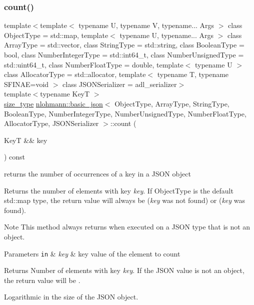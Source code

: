 \subsubsection{\texorpdfstring{count()}{count()}}
{\footnotesize\ttfamily template$<$template$<$ typename U, typename V, typename... Args $>$ class Object\+Type = std\+::map, template$<$ typename U, typename... Args $>$ class Array\+Type = std\+::vector, class String\+Type  = std\+::string, class Boolean\+Type  = bool, class Number\+Integer\+Type  = std\+::int64\+\_\+t, class Number\+Unsigned\+Type  = std\+::uint64\+\_\+t, class Number\+Float\+Type  = double, template$<$ typename U $>$ class Allocator\+Type = std\+::allocator, template$<$ typename T, typename S\+F\+I\+N\+A\+E=void $>$ class J\+S\+O\+N\+Serializer = adl\+\_\+serializer$>$ \\
template$<$typename KeyT $>$ \\
\mbox{\hyperlink{classnlohmann_1_1basic__json_a39f2cd0b58106097e0e67bf185cc519b}{size\+\_\+type}} \mbox{\hyperlink{classnlohmann_1_1basic__json}{nlohmann\+::basic\+\_\+json}}$<$ Object\+Type, Array\+Type, String\+Type, Boolean\+Type, Number\+Integer\+Type, Number\+Unsigned\+Type, Number\+Float\+Type, Allocator\+Type, J\+S\+O\+N\+Serializer $>$\+::count (\begin{DoxyParamCaption}\item[{KeyT \&\&}]{key }\end{DoxyParamCaption}) const\hspace{0.3cm}{\ttfamily [inline]}}



returns the number of occurrences of a key in a J\+S\+ON object 

Returns the number of elements with key {\itshape key}. If Object\+Type is the default {\ttfamily std\+::map} type, the return value will always be {} ({\itshape key} was not found) or {} ({\itshape key} was found).

\begin{DoxyNote}{Note}
This method always returns {} when executed on a J\+S\+ON type that is not an object.
\end{DoxyNote}

\begin{DoxyParams}[1]{Parameters}
\mbox{\tt in}  & {\em key} & key value of the element to count\\
\hline
\end{DoxyParams}
\begin{DoxyReturn}{Returns}
Number of elements with key {\itshape key}. If the J\+S\+ON value is not an object, the return value will be {}.
\end{DoxyReturn}
Logarithmic in the size of the J\+S\+ON object.

